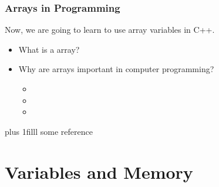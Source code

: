 \documentclass[fleqn]{beamer} %
\newcommand{\sectiontitleI}{Arrays in Programming} %
\newcommand{\sectiontitleII}{Variables and Memory}
\newcommand{\btVFill}{\vskip0pt plus 1filll}
\begin{document}
	\begin{frame} \small
		\frametitle{\sectiontitleI}
	
			Now, we are going to learn to use array variables in C++. \vspace{5mm}\\
			
			\begin{itemize}
			
			\item What is a array? \vspace{5mm} \\
			
			\item Why are arrays important in computer programming? \vspace{5mm}\\
			
				\begin{itemize}
				
					\item 
					
					\item 
					
					\item 
				
				\end{itemize}
	
			\end{itemize}
	
		\btVFill
		\tiny{some reference}	
	\end{frame}


\section{\sectiontitleII}
\end{document}
